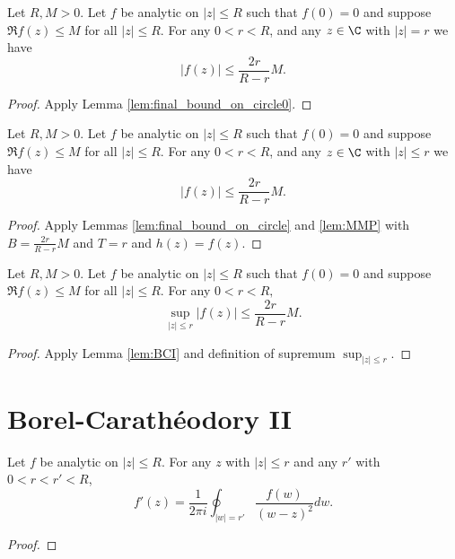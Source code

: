 \begin{lemma}\label{lem:final_bound_on_circle}  \leanok
Let $R,M>0$. Let $f$ be analytic on $|z| \le R$ such that $f(0)=0$ and suppose $\Re f(z) \le M$ for all $|z| \le R$.  For any $0<r < R$, and any $z\in\C$ with $|z|=r$ we have
\[ |f(z)| \le \frac{2r}{R-r}M. \]
\end{lemma}
\begin{proof} \leanok
{}
Apply Lemma \ref{lem:final_bound_on_circle0}.
\end{proof}

\begin{lemma}[BC bound]\label{lem:BCI}  \leanok
Let $R,M>0$. Let $f$ be analytic on $|z| \le R$ such that $f(0)=0$ and suppose $\Re f(z) \le M$ for all $|z| \le R$.  For any $0<r < R$, and any $z\in\C$ with $|z|\le r$ we have
\[ |f(z)| \le \frac{2r}{R-r}M. \]
\end{lemma}
\begin{proof} \leanok
{}
Apply Lemmas \ref{lem:final_bound_on_circle} and \ref{lem:MMP} with $B=\frac{2r}{R-r}M$ and $T=r$ and $h(z)=f(z)$.
\end{proof}



\begin{theorem}\label{thm:BorelCaratheodoryI} 
Let $R,M>0$. Let $f$ be analytic on $|z| \le R$ such that $f(0)=0$ and suppose $\Re f(z) \le M$ for all $|z| \le R$. For any $0<r < R,$
\[ \sup_{|z| \le r} |f(z)| \le \frac{2r}{R-r}M. \] \leanok
\end{theorem}
\begin{proof} \leanok
{}
Apply Lemma \ref{lem:BCI} and definition of supremum $\sup_{|z| \le r}$.
\end{proof}


\section{Borel-Carathéodory II}

\begin{lemma} \label{lem:cauchy_formula_deriv} \leanok
Let $f$ be analytic on $|z| \le R$. For any $z$ with $|z| \le r$ and any $r'$ with $0 < r < r' < R$,
\[ f'(z) = \frac{1}{2\pi i} \oint_{|w|=r'} \frac{f(w)}{(w-z)^2}dw. \]
\end{lemma}
\begin{proof}\leanok
\end{proof}

